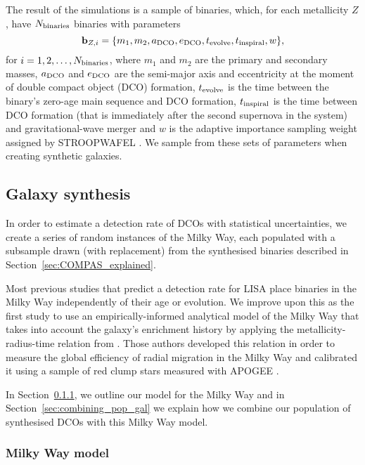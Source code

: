 The result of the simulations is a sample of binaries, which, for each metallicity $Z$, have $N_{\rm binaries}$ binaries with parameters
\begin{equation}
    \mathbf{b}_{{Z, i}} = \{m_1, m_2, a_{\rm DCO}, e_{\rm DCO}, t_{\rm evolve}, t_{\rm inspiral}, w\},
\end{equation}
for $i = 1, 2, \dots, N_{\rm binaries}$, where $m_1$ and $m_2$ are the primary and secondary masses, $a_{\rm DCO}$ and $e_{\rm DCO}$ are the semi-major axis and eccentricity at the moment of double compact object (DCO) formation, $t_{\rm evolve}$ is the time between the binary's zero-age main sequence and DCO formation, $t_{\rm inspiral}$ is the time between DCO formation (that is immediately after the second supernova in the system) and gravitational-wave merger and $w$ is the adaptive importance sampling weight assigned by STROOPWAFEL \cite[][Eq.~7]{Broekgaarden+2019}. We sample from these sets of parameters when creating synthetic galaxies.

\subsection{Galaxy synthesis}\label{sec:galaxy_synthesis}

In order to estimate a detection rate of DCOs with statistical uncertainties, we create a series of random instances of the Milky Way, each populated with a subsample drawn (with replacement) from the synthesised binaries described in Section~\ref{sec:COMPAS_explained}.

Most previous studies that predict a detection rate for LISA place binaries in the Milky Way independently of their age or evolution. We improve upon this as the first study to use an empirically-informed analytical model of the Milky Way that takes into account the galaxy's enrichment history by applying the metallicity-radius-time relation from \citet{Frankel+2018}. Those authors developed this relation in order to measure the global efficiency of radial migration in the Milky Way and calibrated it using a sample of red clump stars measured with APOGEE \citep{Majewski+2017}.

In Section~\ref{sec:mw_model}, we outline our model for the Milky Way and in Section~\ref{sec:combining_pop_gal} we explain how we combine our population of synthesised DCOs with this Milky Way model.

\subsubsection{Milky Way model}\label{sec:mw_model}


